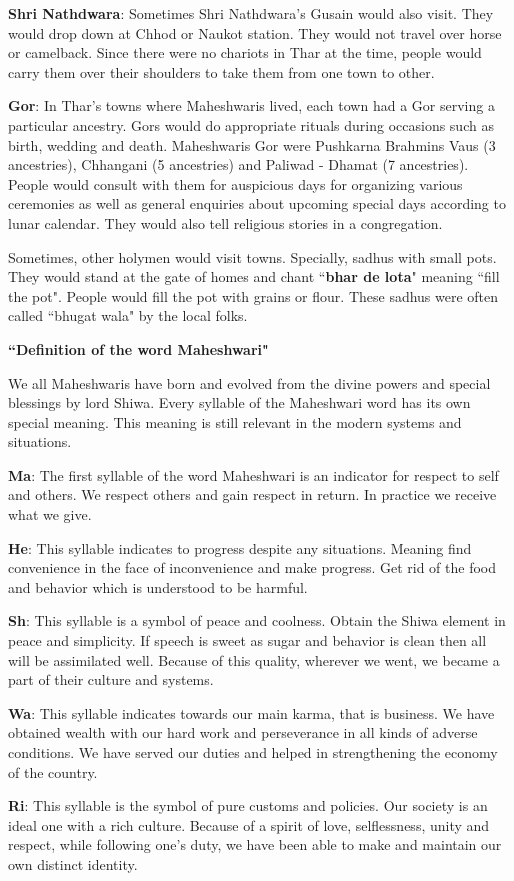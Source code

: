 \textbf{Shri Nathdwara}: Sometimes Shri Nathdwara's Gusain would also visit.
They would drop down at Chhod or Naukot station. They would not travel over
horse or camelback. Since there were no chariots in Thar at the time, people
would carry them over their shoulders to take them from one town to other.

\textbf{Gor}: In Thar's towns where Maheshwaris lived, each town had a Gor
serving a particular ancestry. Gors would do appropriate rituals during
occasions such as birth, wedding and death. Maheshwaris Gor were Pushkarna
Brahmins Vaus (3 ancestries), Chhangani (5 ancestries) and Paliwad - Dhamat (7
ancestries). People would consult with them for auspicious days for organizing
various ceremonies as well as general enquiries about upcoming special days
according to lunar calendar. They would also tell religious stories in a
congregation.

Sometimes, other holymen would visit towns. Specially, sadhus with small pots.
They would stand at the gate of homes and chant ``\textbf{bhar de lota}"
meaning ``fill the pot". People would fill the pot with grains or flour. These
sadhus were often called ``bhugat wala" by the local folks.

\begin{framed}
\begin{center}\textbf{``Definition of the word
Maheshwari"}\end{center}

We all Maheshwaris have born and evolved from the divine powers and special
blessings by lord Shiwa. Every syllable of the Maheshwari word has its own
special meaning. This meaning is still relevant in the modern systems and
situations.

\textbf{Ma}: The first syllable of the word Maheshwari is an indicator for
respect to self and others. We respect others and gain respect in return. In
practice we receive what we give.

\textbf{He}: This syllable indicates to progress despite any situations.
Meaning find convenience in the face of inconvenience and make progress. Get
rid of the food and behavior which is understood to be harmful.

\textbf{Sh}: This syllable is a symbol of peace and coolness. Obtain the Shiwa
element in peace and simplicity. If speech is sweet as sugar and behavior is
clean then all will be assimilated well. Because of this quality, wherever we
went, we became a part of their culture and systems.

\textbf{Wa}: This syllable indicates towards our main karma, that is business.
We have obtained wealth with our hard work and perseverance in all kinds of
adverse conditions. We have served our duties and helped in strengthening the
economy of the country.

\textbf{Ri}: This syllable is the symbol of pure customs and policies. Our
society is an ideal one with a rich culture. Because of a spirit of love,
selflessness, unity and respect, while following one's duty, we have been able
to make and maintain our own distinct identity.

\end{framed}
